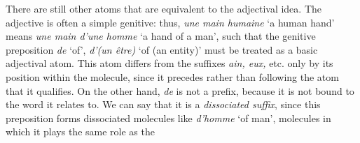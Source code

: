 \begin{sloppypar}
{  There are still other atoms that are equivalent to the adjectival
  idea. The adjective is often a simple genitive: thus, \emph{une main
    humaine} `a human hand' means \emph{une main d'une homme} `a hand
  of a man', such that the genitive preposition \emph{de} `of',
  \emph{d'(un être)} `of (an entity)' must be treated as a basic
  adjectival atom. This atom differs from the suffixes \emph{ain,
    eux,} etc. only by its position within the molecule, since it
  precedes rather than following the atom that it qualifies. On the
  other hand, \emph{de} is not a prefix, because it is not bound to
  the word it relates to.  We can say that it is a \emph{dissociated
    suffix}, since this preposition forms dissociated molecules like
  \emph{d'homme} `of man', molecules in which it plays the same role
  as the }

\end{sloppypar}

